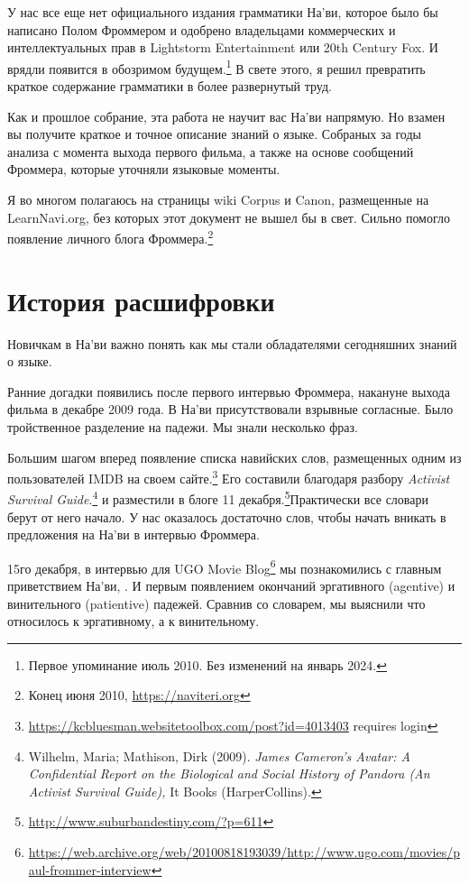 
У нас все еще нет официального издания грамматики На'ви, которое
было бы написано Полом Фроммером и одобрено владельцами
коммерческих и интеллектуальных прав в Lightstorm Entertainment
или 20th Century Fox. И врядли появится в обозримом
будущем.\footnote{Первое упоминание июль 2010. Без изменений на
январь
2024.} В свете этого, я решил превратить краткое содержание
грамматики в более развернутый труд.

Как и прошлое собрание, эта работа не научит вас На'ви напрямую. Но взамен вы получите краткое и точное описание знаний о языке.
Собраных за годы анализа с момента выхода первого фильма, а
также на основе сообщений Фроммера, которые уточняли языковые
моменты.

Я во многом полагаюсь на страницы wiki Corpus и Canon,
размещенные на LearnNavi.org,
без которых этот документ не вышел бы в свет. Сильно помогло
появление личного блога Фроммера.\footnote{Конец июня 2010,
\url{https://naviteri.org}}


\section{История расшифровки}
Новичкам в На'ви важно понять как мы стали обладателями
сегодняшних знаний о языке.

Ранние догадки появились после первого интервью Фроммера,
накануне выхода фильма в декабре 2009 года. В На'ви
присутствовали взрывные согласные. Было тройственное разделение
на падежи. Мы знали несколько фраз.

Большим шагом вперед появление списка навийских слов,
размещенных одним из пользователей IMDB на своем
сайте.\footnote{\url{https://kcbluesman.websitetoolbox.com/post?id=4013403}
requires login} Его составили благодаря разбору \textit{Activist
Survival Guide}.\footnote{Wilhelm, Maria; Mathison, Dirk (2009).
\textit{James
Cameron's Avatar: A Confidential Report on the Biological and
Social
History of Pandora (An Activist Survival Guide),} It Books
(HarperCollins).}
и разместили в блоге 11
декабря.\footnote{\url{http://www.suburbandestiny.com/?p=611}}Практически
все словари берут от него начало. У нас оказалось достаточно
слов, чтобы начать вникать в предложения на На'ви в интервью
Фроммера.

15го декабря, в интервью для UGO Movie
Blog\footnote{\url{https://web.archive.org/web/20100818193039/http://www.ugo.com/movies/paul-frommer-interview}}
мы познакомились с главным приветствием На'ви,  . И первым появлением окончаний
эргативного (agentive) и винительного (patientive) падежей.
Сравнив со словарем, мы выяснили что  относилось к
эргативному, а  к винительному.


